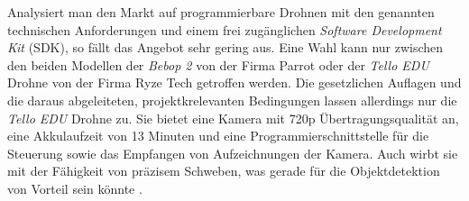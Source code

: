 Analysiert man den Markt auf programmierbare Drohnen mit den genannten technischen Anforderungen und einem frei zugänglichen \textit{Software Development Kit} (SDK), so fällt das Angebot sehr gering aus. Eine Wahl kann nur zwischen den beiden Modellen der \textit{Bebop 2} von der Firma Parrot oder der \textit{Tello EDU} Drohne von der Firma Ryze Tech getroffen werden. Die gesetzlichen Auflagen und die daraus abgeleiteten, projektkrelevanten Bedingungen lassen allerdings nur die \textit{Tello EDU} Drohne zu. Sie bietet eine Kamera mit 720p Übertragungsqualität an, eine Akkulaufzeit von 13 Minuten und eine Programmierschnittstelle für die Steuerung sowie das Empfangen von Aufzeichnungen der Kamera. Auch wirbt sie mit der Fähigkeit von präzisem Schweben, was gerade für die Objektdetektion von Vorteil sein könnte \cite{RyzeRobotics.2020}.